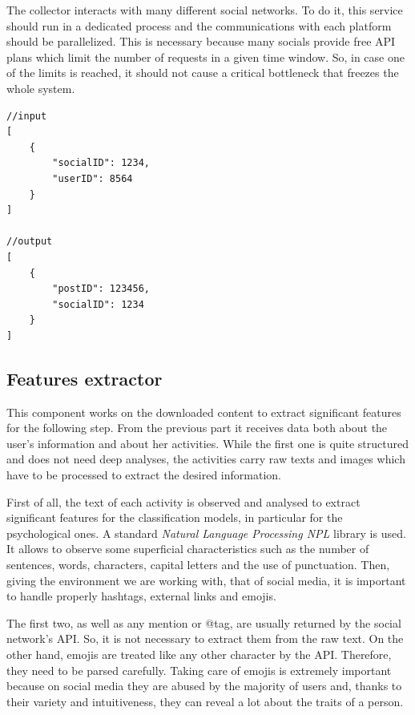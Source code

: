 The collector interacts with many different social networks. To do it, this service should run in a dedicated process and the communications with each platform should be parallelized.
This is necessary because many socials provide free API plans which limit the number of requests in a given time window. So, in case one of the limits is reached, it should not cause a critical bottleneck that freezes the whole system.

\begin{multicols}{2}
\begin{verbatim}
//input
[
    {
        "socialID": 1234,
        "userID": 8564
    }
]

//output
[
    {
        "postID": 123456,
        "socialID": 1234
    }
]
\end{verbatim}
\end{multicols}

\subsection{Features extractor}
This component works on the downloaded content to extract significant features for the following step.
From the previous part it receives data both about the user's information and about her activities. While the first one is quite structured and does not need deep analyses, the activities carry raw texts and images which have to be processed to extract the desired information.

First of all, the text of each activity is observed and analysed to extract significant features for the classification models, in particular for the psychological ones.
A standard \emph{Natural Language Processing NPL} library is used. It allows to observe some superficial characteristics such as the number of sentences, words, characters, capital letters and the use of punctuation.
Then, giving the environment we are working with, that of social media, it is important to handle properly hashtags, external links and emojis.

The first two, as well as any mention or @tag, are usually returned by the social network's API. So, it is not necessary to extract them from the raw text.
On the other hand, emojis are treated like any other character by the API. Therefore, they need to be parsed carefully.
Taking care of emojis is extremely important because on social media they are abused by the majority of users and, thanks to their variety and intuitiveness, they can reveal a lot about the traits of a person.


